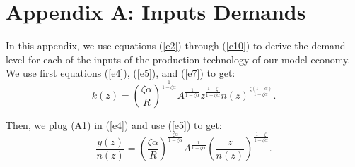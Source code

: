 \documentclass[12pt]{article}
\begin{document}
\setcounter{lemma}{0}
\setcounter{proposition}{0}
\setcounter{theorem}{0}
\setcounter{corollary}{0}
\section*{ Appendix A:  Inputs Demands}
In this appendix, we use equations (\ref{e2}) through (\ref{e10}) to derive the demand level for each of the inputs of the production technology of our model economy. We use first equations (\ref{e4}),  (\ref{e5}), and (\ref{e7}) to get:
\begin{equation}\tag{A1}
k(z)=\left(\frac{\zeta\alpha}{R}\right)^{\frac{1}{1-\zeta \alpha}}A^{\frac{1}{1-\zeta\alpha}}z^{\frac{1-\zeta}{1-\zeta\alpha}}n(z)^{\frac{\zeta(1-\alpha)}{1-\zeta\alpha}}.
\end{equation}

Then, we plug (A1) in (\ref{e4}) and use (\ref{e5}) to get:
\begin{equation}\tag{A2}
\frac{y(z)}{n(z)}=\left(\frac{\zeta\alpha}{R}\right)^{\frac{\zeta\alpha}{1-\zeta \alpha}}A^{\frac{1}{1-\zeta\alpha}}\left(\frac{z}{n(z)}\right)^\frac{1-\zeta}{1-\zeta\alpha}.
\end{equation}

\newpage
{\normalsize \setcounter{secnumdepth}{0}}
\end{document}
